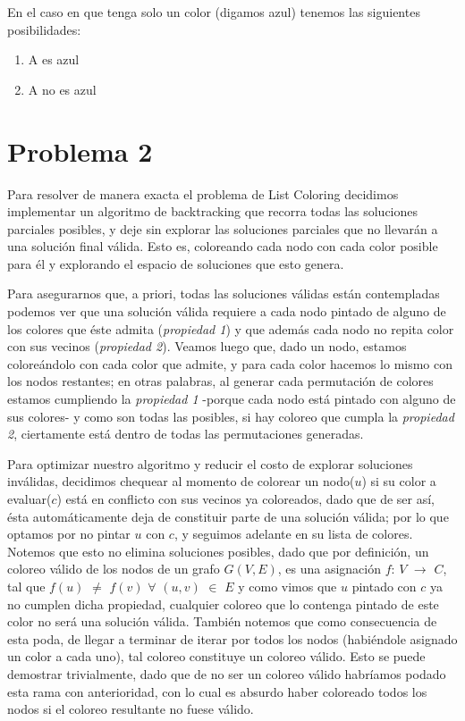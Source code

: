 \documentclass{article}
\theoremstyle{definition}
\theoremstyle{remark}
\begin{document}
En el caso en que tenga solo un color (digamos azul) tenemos las siguientes posibilidades:
\begin{enumerate}
\item A es azul
\item A no es azul
\end{enumerate}

\section{Problema 2}

Para resolver de manera exacta el problema de List Coloring decidimos implementar un algoritmo de backtracking que recorra todas las soluciones parciales posibles, y deje sin explorar las soluciones parciales que no llevarán a una solución final válida. Esto es, coloreando cada nodo con cada color posible para él y explorando el espacio de soluciones que esto genera. 

Para asegurarnos que, a priori, todas las soluciones válidas están contempladas podemos ver que una solución válida requiere a cada nodo pintado de alguno de los colores que éste admita (\textit{propiedad 1}) y que además cada nodo no repita color con sus vecinos (\textit{propiedad 2}). Veamos luego que, dado un nodo, estamos coloreándolo con cada color que admite, y para cada color hacemos lo mismo con los nodos restantes; en otras palabras, al generar cada permutación de colores estamos cumpliendo la \textit{propiedad 1} -porque cada nodo está pintado con alguno de sus colores- y como son todas las posibles, si hay coloreo que cumpla la \textit{propiedad 2}, ciertamente está dentro de todas las permutaciones generadas. 

Para optimizar nuestro algoritmo y reducir el costo de explorar soluciones inválidas, decidimos chequear al momento de colorear un nodo($u$) si su color a evaluar($c$) está en conflicto con sus vecinos ya coloreados, dado que de ser así, ésta automáticamente deja de constituir parte de una solución válida; por lo que optamos por no pintar $u$ con $c$, y seguimos adelante en su lista de colores.  
Notemos que esto no elimina soluciones posibles, dado que por definición, un coloreo válido de los nodos de un grafo $G(V,E)$, es una asignación $f$: $V$ $\rightarrow$ $C$, tal que $f(u)$ $\neq$ $f(v)$ $\forall$ $(u,v)$ $\in$ $E$ y como vimos que $u$ pintado con $c$ ya no cumplen dicha propiedad, cualquier coloreo que lo contenga pintado de este color no será una solución válida. También notemos que como consecuencia de esta poda, de llegar a terminar de iterar por todos los nodos (habiéndole asignado un color a cada uno), tal coloreo constituye un coloreo válido. Esto se puede demostrar trivialmente, dado que de no ser un coloreo válido habríamos podado esta rama con anterioridad, con lo cual es absurdo haber coloreado todos los nodos si el coloreo resultante no fuese válido. 
\end{document}
